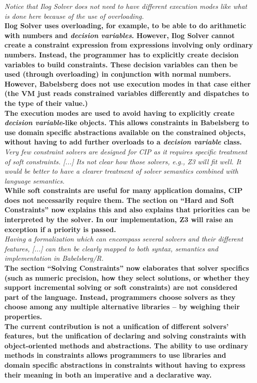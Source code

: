 \documentclass[english]{article}
\begin{document}
\textit{Notice that Ilog Solver does not need to have different
  execution modes like what is done here because of the use of
  overloading.}\\
\textbf{Ilog Solver uses overloading, for example, to be able to do
  arithmetic with numbers and \emph{decision variables}. However, Ilog
  Solver cannot create a constraint expression from expressions
  involving only ordinary numbers. Instead, the programmer has to
  explicitly create decision variables to build constraints. These
  decision variables can then be used (through overloading) in
  conjunction with normal numbers. However, Babelsberg does not use
  execution modes in that case either (the VM just reads constrained
  variables differently and
  dispatches to the type of their value.)\\
  The execution modes are used to avoid having to explicitly create
  \emph{decision variable}-like objects. This allows constraints in
  Babelsberg to use domain specific abstractions available on the
  constrained objects, without having to
  add further overloads to a \emph{decision variable} class.}\\

\textit{Very few constraint solvers are designed for CIP as it
  requires specific treatment of soft constraints. [...] Its not clear
  how those solvers, e.g., Z3 will fit well. It would be better to
  have a clearer treatment of solver semantics combined with language
  semantics.}\\
\textbf{While soft constraints are useful for many application
  domains, CIP does not necessarily require them. The section on
  ``Hard and Soft Constraints'' now explains this and also explains
  that priorities can be interpreted by the solver. In our
  implementation, Z3 will raise an exception if a priority is
  passed.}\\

\textit{Having a formalization which can encompass several solvers and
  their different features, [...] can then be clearly mapped to both
  syntax, semantics and implementation in Babelsberg/R.}\\
\textbf{The section ``Solving Constraints'' now elaborates that solver
  specifics (such as numeric precision, how they select solutions, or
  whether they support incremental solving or soft constraints) are
  not considered part of the language. Instead, programmers choose
  solvers as they choose among any multiple alternative
  libraries -- by weighing their properties.\\
  The current contribution is not a unification of different solvers'
  features, but the unification of declaring and solving constraints
  with object-oriented methods and abstractions. The ability to use
  ordinary methods in constraints allows programmers to use libraries
  and domain specific abstractions in constraints without having to
  express their meaning in both an imperative and a declarative
  way.}\\
\end{document}
